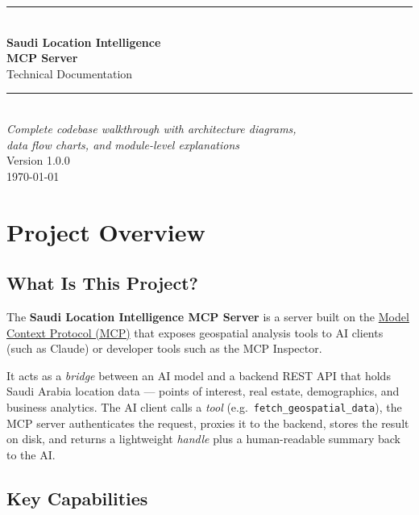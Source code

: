 \documentclass[12pt,a4paper]{report}
\begin{document}
\begin{titlepage}
  \centering
  \vspace*{3cm}
  {\color{accent}\rule{\linewidth}{1.5pt}}\\[1.5em]
  {\Huge\bfseries\color{accent} Saudi Location Intelligence\\[0.4em] MCP Server}\\[1em]
  {\Large Technical Documentation}\\[0.5em]
  {\color{accent}\rule{\linewidth}{1.5pt}}\\[3em]
  {\large\textit{Complete codebase walkthrough with architecture diagrams,\\
  data flow charts, and module-level explanations}}\\[5cm]
  {\large Version 1.0.0}\\[0.5em]
  {\large\today}
  \vfill
\end{titlepage}

\tableofcontents
\listoffigures
\newpage

\chapter{Project Overview}

\section{What Is This Project?}

The \textbf{Saudi Location Intelligence MCP Server} is a server built on the
\href{https://modelcontextprotocol.io}{Model Context Protocol (MCP)} that exposes
geospatial analysis tools to AI clients (such as Claude) or developer tools such
as the MCP Inspector.

It acts as a \emph{bridge} between an AI model and a backend REST API that holds
Saudi Arabia location data --- points of interest, real estate, demographics,
and business analytics. The AI client calls a \emph{tool} (e.g.\ \texttt{fetch\_geospatial\_data}),
the MCP server authenticates the request, proxies it to the backend, stores the
result on disk, and returns a lightweight \emph{handle} plus a human-readable
summary back to the AI.

\section{Key Capabilities}
\end{document}
